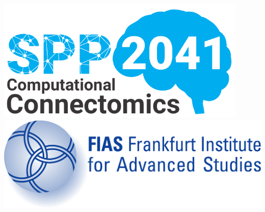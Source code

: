 \documentclass[a0,portrait]{a0poster}
\begin{document}
\begin{minipage}[b]{0.5\linewidth}
  \centering
  
  \vspace{-3cm}
  \includegraphics[width=12cm]{spp2041_logo.pdf}\\
  \vspace{2.2cm}
  \includegraphics[width=13.5cm]{FIAS-logo.pdf}\\
  \vspace{2cm}
  
\end{minipage}


\begin{multicols}{2} %
  
  
  


  
  \printbibliography  

\end{multicols}



\end{document}

